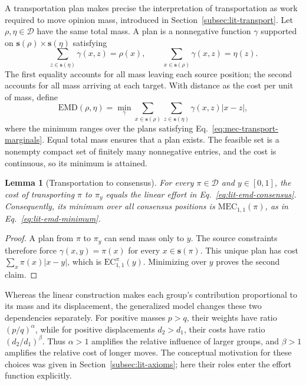 \documentclass{article}
\theoremstyle{plain}
\newtheorem{lemma}{Lemma}
\theoremstyle{remark}
\begin{document}
A transportation plan makes precise the interpretation of transportation as work required to move opinion mass, introduced in Section~\ref{subsec:lit-transport}. Let $\rho,\eta\in\mathcal{D}$ have the same total mass. A plan is a nonnegative function $\gamma$ supported on $\boldsymbol{s}(\rho)\times\boldsymbol{s}(\eta)$ satisfying
\begin{equation}\label{eq:mec-transport-marginals}
\sum_{z\in\boldsymbol{s}(\eta)}\gamma(x,z)=\rho(x),
\qquad
\sum_{x\in\boldsymbol{s}(\rho)}\gamma(x,z)=\eta(z).
\end{equation}
The first equality accounts for all mass leaving each source position; the second accounts for all mass arriving at each target. With distance as the cost per unit of mass, define
\begin{equation}\label{eq:mec-transport-definition}
\mathrm{EMD}(\rho,\eta)
=\min_{\gamma}\sum_{x\in\boldsymbol{s}(\rho)}
                     \sum_{z\in\boldsymbol{s}(\eta)}\gamma(x,z)|x-z|,
\end{equation}
where the minimum ranges over the plans satisfying Eq.~\eqref{eq:mec-transport-marginals}. Equal total mass ensures that a plan exists. The feasible set is a nonempty compact set of finitely many nonnegative entries, and the cost is continuous, so its minimum is attained.

\begin{lemma}[Transportation to consensus]\label{lem:mec-consensus-transport}
For every $\pi\in\mathcal{D}$ and $y\in[0,1]$, the cost of transporting $\pi$ to $\pi_y$ equals the linear effort in Eq.~\eqref{eq:lit-emd-consensus}. Consequently, its minimum over all consensus positions is $\mathrm{MEC}_{1,1}(\pi)$, as in Eq.~\eqref{eq:lit-emd-minimum}.
\end{lemma}
\begin{proof}
A plan from $\pi$ to $\pi_y$ can send mass only to $y$. The source constraints therefore force $\gamma(x,y)=\pi(x)$ for every $x\in\boldsymbol{s}(\pi)$. This unique plan has cost $\sum_x\pi(x)|x-y|$, which is $\mathrm{EC}_{1,1}^{\pi}(y)$. Minimizing over $y$ proves the second claim.
\end{proof}

Whereas the linear construction makes each group's contribution proportional to its mass and its displacement, the generalized model changes these two dependencies separately. For positive masses $p>q$, their weights have ratio $(p/q)^\alpha$, while for positive displacements $d_2>d_1$, their costs have ratio $(d_2/d_1)^\beta$. Thus $\alpha>1$ amplifies the relative influence of larger groups, and $\beta>1$ amplifies the relative cost of longer moves. The conceptual motivation for these choices was given in Section~\ref{subsec:lit-axioms}; here their roles enter the effort function explicitly.
\end{document}
